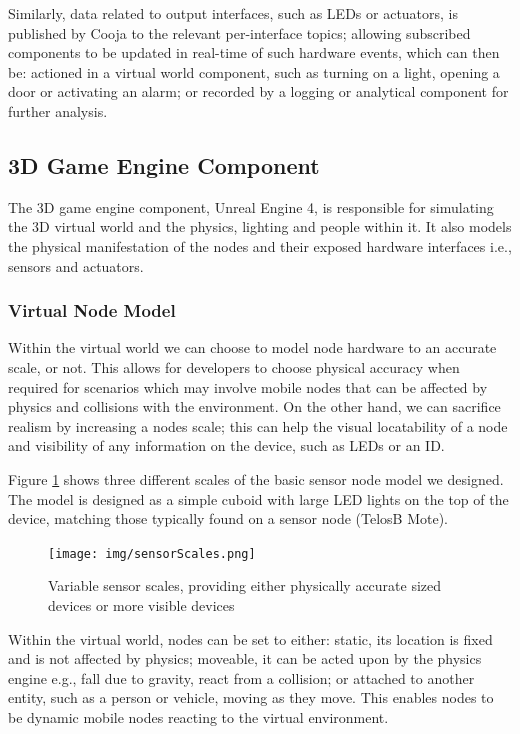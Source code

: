 Similarly, data related to output interfaces, such as LEDs or actuators, is published by Cooja to the relevant per-interface topics; allowing subscribed components to be updated in real-time of such hardware events, which can then be: actioned in a virtual world component, such as turning on a light, opening a door or activating an alarm; or recorded by a logging or analytical component for further analysis.



\subsection{3D Game Engine Component} %
\label{sub:3d_game_engine_component}
The 3D game engine component, Unreal Engine 4, is responsible for simulating the 3D virtual world and the physics, lighting and people within it. It also models the physical manifestation of the nodes and their exposed hardware interfaces i.e., sensors and actuators.

\subsubsection{Virtual Node Model} %
\label{ssub:virtual_node_hardware}
Within the virtual world we can choose to model node hardware to an accurate scale, or not. This allows for developers to choose physical accuracy when required for scenarios which may involve mobile nodes that can be affected by physics and collisions with the environment. On the other hand, we can sacrifice realism by increasing a nodes scale; this can help the visual locatability of a node and visibility of any information on the device, such as LEDs or an ID.

Figure \ref{fig:sensor_scales} shows three different scales of the basic sensor node model we designed. The model is designed as a simple cuboid with large LED lights on the top of the device, matching those typically found on a sensor node (TelosB Mote).
\begin{figure}[tbh]
   \centering
   \texttt{[image: img/sensorScales.png]}
   \caption{Variable sensor scales, providing either physically accurate sized devices or more visible devices}
   \label{fig:sensor_scales}
 \end{figure} 

Within the virtual world, nodes can be set to either: static, its location is fixed and is not affected by physics; moveable, it can be acted upon by the physics engine e.g., fall due to gravity, react from a collision; or attached to another entity, such as a person or vehicle, moving as they move. This enables nodes to be dynamic mobile nodes reacting to the virtual environment.

